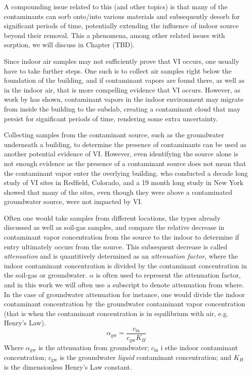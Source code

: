 A compounding issue related to this (and other topics) is that many of the contaminants can sorb onto/into various materials and subsequently desorb for significant periods of time, potentially extending the influence of indoor source beyond their removal.
This a phenomena, among other related issues with sorption, we will discuss in Chapter (TBD).\par %

Since indoor air samples may not sufficiently prove that VI occurs, one usually have to take further steps.
One such is to collect air samples right below the foundation of the building, and if contaminant vapors are found there, as well as in the indoor air, that is more compelling evidence that VI occurs.
However, as work by \citeauthor{holton_creation_2018}\cite{holton_creation_2018} has shown, contaminant vapors in the indoor environment may migrate from inside the building to the subslab, creating a contaminant cloud that may persist for significant periods of time, rendering some extra uncertainty.\par

Collecting samples from the contaminant source, such as the groundwater underneath a building, to determine the presence of contaminants can be used as another potential evidence of VI.
However, even identifying the source alone is not enough evidence as the presence of a contaminant source does not mean that the contaminant vapor enter the overlying building.
\citeauthor{folkes_observed_2009}\cite{folkes_observed_2009} who conducted a decade long study of VI sites in Redfield, Colorado, and a 19 month long study in New York showed that many of the sites, even though they were above a contaminated groundwater source, were not impacted by VI.\par

Often one would take samples from different locations, the types already discussed as well as soil-gas samples, and compare the relative decrease in contaminant vapor concentration from the source to the indoor to determine if entry ultimately occurs from the source.
This subsequent decrease is called \textit{attenuation} and is quantitively determined as an \textit{attenuation factor}, where the indoor contaminant concentration is divided by the contaminant concentration in the soil-gas or groundwater.
$\alpha$ is often used to represent the attenuation factor, and in this work we will often use a subscript to denote attenuation from where.
In the case of groundwater attenuation for instance, one would divide the indoor contaminant concentration by the groundwater contaminant vapor concentration (that is when the contaminant concentration is in equilibrium with air, e.g. Henry's Law).
\begin{equation}
  \alpha_\mathrm{gw} = \frac{c_\mathrm{in}}{c_\mathrm{gw} K_H}
\end{equation}
Where $\alpha_\mathrm{gw}$ is the attenuation from groundwater;
$c_\mathrm{in}$ i sthe indoor contaminant concentration;
$c_\mathrm{gw}$ is the groundwater \textit{liquid} contaminant concentration;
and $K_H$ is the dimensionless Henry's Law constant.\par

